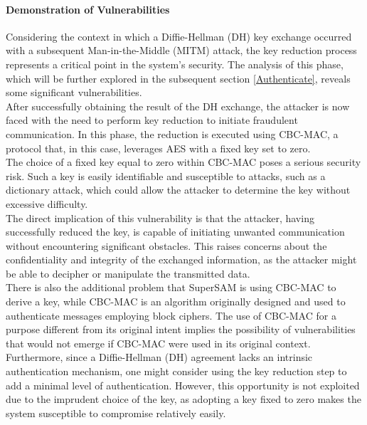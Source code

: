 \documentclass[12pt]{article}
\begin{document}
    \paragraph{Demonstration of Vulnerabilities}
    Considering the context in which a Diffie-Hellman (DH) key exchange occurred with a subsequent Man-in-the-Middle (MITM) attack, the key reduction process represents a critical point in the system's security. The analysis of this phase, which will be further explored in the subsequent section \ref*{Authenticate}, reveals some significant vulnerabilities.
    \\
    After successfully obtaining the result of the DH exchange, the attacker is now faced with the need to perform key reduction to initiate fraudulent communication. In this phase, the reduction is executed using CBC-MAC, a protocol that, in this case, leverages AES with a fixed key set to zero.
    \\
    The choice of a fixed key equal to zero within CBC-MAC poses a serious security risk. Such a key is easily identifiable and susceptible to attacks, such as a dictionary attack, which could allow the attacker to determine the key without excessive difficulty.
    \\
    The direct implication of this vulnerability is that the attacker, having successfully reduced the key, is capable of initiating unwanted communication without encountering significant obstacles. This raises concerns about the confidentiality and integrity of the exchanged information, as the attacker might be able to decipher or manipulate the transmitted data.
    \\
    There is also the additional problem that SuperSAM is using CBC-MAC to derive a key, while CBC-MAC is an algorithm originally designed and used to authenticate messages employing block ciphers. The use of CBC-MAC for a purpose different from its original intent implies the possibility of vulnerabilities that would not emerge if CBC-MAC were used in its original context.
    \\
    Furthermore, since a Diffie-Hellman (DH) agreement lacks an intrinsic authentication mechanism, one might consider using the key reduction step to add a minimal level of authentication. However, this opportunity is not exploited due to the imprudent choice of the key, as adopting a key fixed to zero makes the system susceptible to compromise relatively easily.
        
\end{document}
